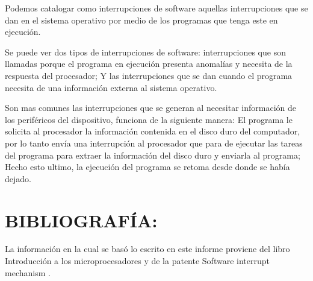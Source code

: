 \documentclass[12pt,letterpaper]{article}
\begin{document}
Podemos catalogar como interrupciones de software aquellas interrupciones que se dan en el sistema operativo por medio de los programas que tenga este en ejecución.

Se puede ver dos tipos de interrupciones de software: interrupciones que son llamadas porque el programa en ejecución presenta anomalías y necesita de la respuesta del procesador; Y las interrupciones que se dan cuando el programa necesita de una información externa al sistema operativo.

Son mas comunes las interrupciones que se generan al necesitar información de los periféricos del dispositivo, funciona de la siguiente manera: El programa le solicita al procesador la información contenida en el disco duro del computador, por lo tanto envía una interrupción al procesador que para de ejecutar las tareas del programa para extraer la información del disco duro y enviarla al programa; Hecho esto ultimo, la ejecución del programa se retoma desde donde se había dejado.

\section{BIBLIOGRAFÍA:}

La información en la cual se basó lo escrito en este informe proviene del libro Introducción a los microprocesadores \cite{milanes2003introduccion}  y de la patente Software interrupt mechanism \cite{lebee2000software}.











\end{document}
